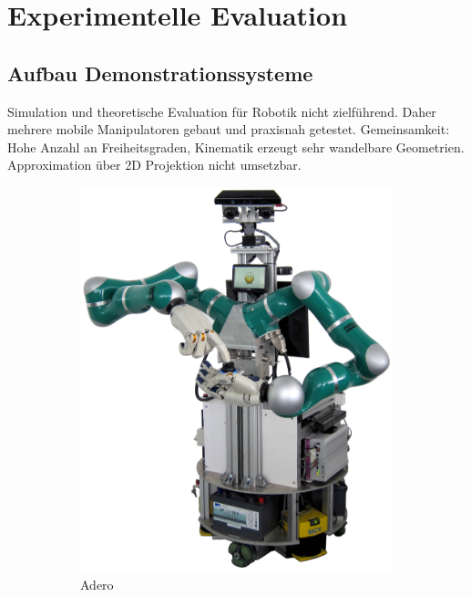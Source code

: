 \chapter{Experimentelle Evaluation}
\label{chap:experimente}

\section{Aufbau Demonstrationssysteme}
Simulation und theoretische Evaluation für Robotik nicht zielführend.
Daher mehrere mobile Manipulatoren gebaut und praxisnah getestet. 
Gemeinsamkeit: Hohe Anzahl an Freiheitsgraden, Kinematik erzeugt sehr wandelbare Geometrien.
Approximation über 2D Projektion nicht umsetzbar.

\begin{figure}[hbtp]
	\centering
	\begin{subfigure}[t]{0.33\textwidth}
		\includegraphics[width=\textwidth]{04_images/robots/Adero.png}
		\caption{Adero}
		\label{subfig:Adero}
	\end{subfigure}
	\begin{subfigure}[t]{0.28\textwidth}

\end{subfigure}
\end{figure}
